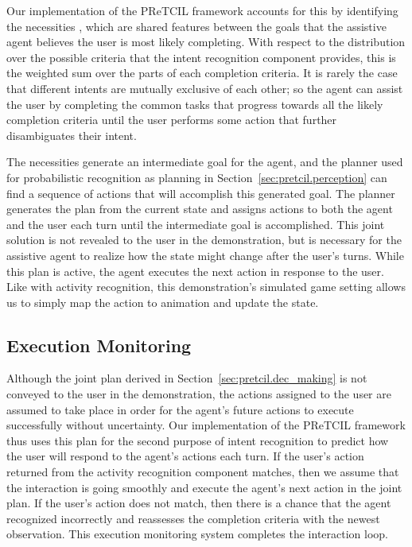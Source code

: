 \documentclass[letterpaper]{article} %
\begin{document}
Our implementation of the {\sc PReTCIL} framework accounts for this by identifying the necessities \cite{fz_aaai2017}, which are shared features between the goals that the assistive agent believes the user is most likely completing.  With respect to the distribution over the possible criteria that the intent recognition component provides, this is the weighted sum over the parts of each completion criteria.  It is rarely the case that different intents are mutually exclusive of each other; so the agent can assist the user by completing the common tasks that progress towards all the likely completion criteria until the user performs some action that further disambiguates their intent.

The necessities generate an intermediate goal for the agent, and the planner used for probabilistic recognition as planning in Section~\ref{sec:pretcil.perception} can find a sequence of actions that will accomplish this generated goal.  The planner generates the plan from the current state and assigns actions to both the agent and the user each turn until the intermediate goal is accomplished.  This joint solution is not revealed to the user in the demonstration, but is necessary for the assistive agent to realize how the state might change after the user's turns.  While this plan is active, the agent executes the next action in response to the user.  Like with activity recognition, this demonstration's simulated game setting allows us to simply map the action to animation and update the state.

\subsection{Execution Monitoring\label{sec:pretcil.exec_monitor}}
Although the joint plan derived in Section~\ref{sec:pretcil.dec_making} is not conveyed to the user in the demonstration, the actions assigned to the user are assumed to take place in order for the agent's future actions to execute successfully without uncertainty.  Our implementation of the {\sc PReTCIL} framework thus uses this plan for the second purpose of intent recognition to predict how the user will respond to the agent's actions each turn.  If the user's action returned from the activity recognition component matches, then we assume that the interaction is going smoothly and execute the agent's next action in the joint plan.  If the user's action does not match, then there is a chance that the agent recognized incorrectly and reassesses the %
 completion criteria with the newest observation.  This execution monitoring system completes the interaction loop.%
\end{document}
